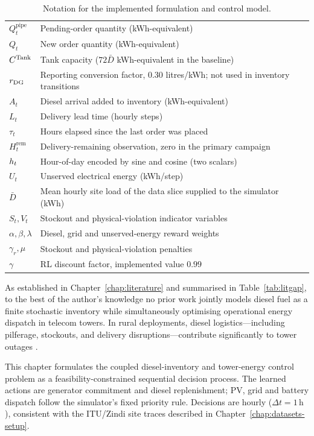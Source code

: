 \begin{table}[htbp]
\begin{tabular}{l>{\raggedright\arraybackslash}p{9.8cm}}
$Q_t^{\mathrm{pipe}}$ & Pending-order quantity (kWh-equivalent) \\
$Q_t$ & New order quantity (kWh-equivalent) \\
$C^{\Tank}$ & Tank capacity ($72\bar D$ kWh-equivalent in the baseline) \\
$r_{\DG}$ & Reporting conversion factor, $0.30$ litres/kWh; not used in inventory transitions \\
$A_t$ & Diesel arrival added to inventory (kWh-equivalent) \\
$L_t$ & Delivery lead time (hourly steps) \\
$\tau_t$ & Hours elapsed since the last order was placed \\
$H_t^{\mathrm{rem}}$ & Delivery-remaining observation, zero in the primary campaign \\
$\hour_t$ & Hour-of-day encoded by sine and cosine (two scalars) \\
$U_t$ & Unserved electrical energy (kWh/step) \\
$\bar D$ & Mean hourly site load of the data slice supplied to the simulator (kWh) \\
$S_t,V_t$ & Stockout and physical-violation indicator variables \\
$\alpha,\beta,\lambda$ & Diesel, grid and unserved-energy reward weights \\
$\gamma_r,\mu$ & Stockout and physical-violation penalties \\
$\gamma$ & RL discount factor, implemented value $0.99$ \\
\bottomrule
\end{tabular}
\caption{Notation for the implemented formulation and control model.}
\label{tab:notation}
\end{table}

As established in Chapter~\ref{chap:literature} and summarised in
Table~\ref{tab:litgap}, to the best of the author's knowledge no prior work
jointly models diesel fuel as a finite stochastic inventory while
simultaneously optimising operational energy dispatch in telecom towers.
In rural deployments, diesel logistics---including pilferage, stockouts, and
delivery disruptions---contribute significantly to tower outages
\citep{datoms2024,alton2025,gsma2025b,trai2024}.

This chapter formulates the coupled diesel-inventory and tower-energy
control problem as a feasibility-constrained sequential decision process.
The learned actions are generator commitment and diesel replenishment;
PV, grid and battery dispatch follow the simulator's fixed priority rule.
Decisions are hourly ($\Delta t=1\,\mathrm{h}$), consistent with the
ITU/Zindi site traces described in Chapter~\ref{chap:datasets-setup}.


